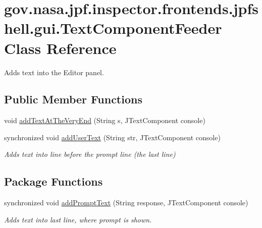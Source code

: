 \hypertarget{classgov_1_1nasa_1_1jpf_1_1inspector_1_1frontends_1_1jpfshell_1_1gui_1_1_text_component_feeder}{}\section{gov.\+nasa.\+jpf.\+inspector.\+frontends.\+jpfshell.\+gui.\+Text\+Component\+Feeder Class Reference}
\label{classgov_1_1nasa_1_1jpf_1_1inspector_1_1frontends_1_1jpfshell_1_1gui_1_1_text_component_feeder}


Adds text into the Editor panel.  


\subsection*{Public Member Functions}
\begin{DoxyCompactItemize}
\item 
void \hyperlink{classgov_1_1nasa_1_1jpf_1_1inspector_1_1frontends_1_1jpfshell_1_1gui_1_1_text_component_feeder_a7806b34153d3d577221d9d7f1f963014}{add\+Text\+At\+The\+Very\+End} (String s, J\+Text\+Component console)
\item 
synchronized void \hyperlink{classgov_1_1nasa_1_1jpf_1_1inspector_1_1frontends_1_1jpfshell_1_1gui_1_1_text_component_feeder_a8fc7b8c3c9cd70c21b416fc5d79ffde1}{add\+User\+Text} (String str, J\+Text\+Component console)
\begin{DoxyCompactList}\small\item\em Adds text into line before the prompt line (the last line) \end{DoxyCompactList}\end{DoxyCompactItemize}
\subsection*{Package Functions}
\begin{DoxyCompactItemize}
\item 
synchronized void \hyperlink{classgov_1_1nasa_1_1jpf_1_1inspector_1_1frontends_1_1jpfshell_1_1gui_1_1_text_component_feeder_abd579cf011df675c47a244274ee89bd5}{add\+Prompt\+Text} (String response, J\+Text\+Component console)
\begin{DoxyCompactList}\small\item\em Adds text into last line, where prompt is shown. \end{DoxyCompactList}\end{DoxyCompactItemize}
